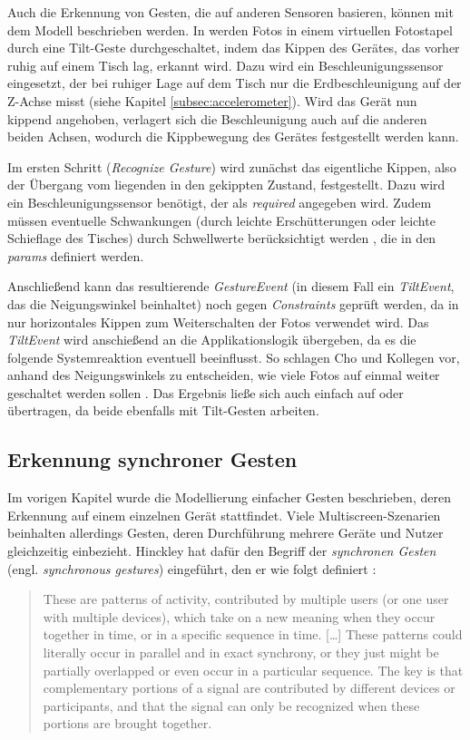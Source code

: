 Auch die Erkennung von Gesten, die auf anderen Sensoren basieren, können mit dem Modell beschrieben werden. In \citep{Lucero2011} werden Fotos in einem virtuellen Fotostapel durch eine Tilt-Geste durchgeschaltet, indem das Kippen des Gerätes, das vorher ruhig auf einem Tisch lag, erkannt wird. Dazu wird ein Beschleunigungssensor eingesetzt, der bei ruhiger Lage auf dem Tisch nur die Erdbeschleunigung auf der Z-Achse misst (siehe Kapitel \ref{subsec:accelerometer}). Wird das Gerät nun kippend angehoben, verlagert sich die Beschleunigung auch auf die anderen beiden Achsen, wodurch die Kippbewegung des Gerätes festgestellt werden kann.

Im ersten Schritt (\textit{Recognize Gesture}) wird zunächst das eigentliche Kippen, also der Übergang vom liegenden in den gekippten Zustand, festgestellt. Dazu wird ein Beschleunigungssensor benötigt, der als \textit{required} angegeben wird. Zudem müssen eventuelle Schwankungen (\zb durch leichte Erschütterungen oder leichte Schieflage des Tisches) durch Schwellwerte berücksichtigt werden \citep{Dachselt2009}, die in den \textit{params} definiert werden.

Anschließend kann das resultierende \textit{GestureEvent} (in diesem Fall ein \textit{TiltEvent}, das \zb die Neigungswinkel beinhaltet) noch gegen \textit{Constraints} geprüft werden, da in \citep{Lucero2011} \zb nur horizontales Kippen zum Weiterschalten der Fotos verwendet wird. Das \textit{TiltEvent} wird anschießend an die Applikationslogik übergeben, da es die folgende Systemreaktion eventuell beeinflusst. So schlagen Cho und Kollegen \zb vor, anhand des Neigungswinkels zu entscheiden, wie viele Fotos auf einmal weiter geschaltet werden sollen \citep{Cho2007}. Das Ergebnis ließe sich auch einfach auf \citep{Rekimoto1996} oder \citep{Dachselt2009} übertragen, da beide ebenfalls mit Tilt-Gesten arbeiten.

\subsection{Erkennung synchroner Gesten}
\label{subsec:synchronous_gesture}
Im vorigen Kapitel wurde die Modellierung einfacher Gesten beschrieben, deren Erkennung auf einem einzelnen Gerät stattfindet. Viele Multiscreen-Szenarien beinhalten allerdings Gesten, deren Durchführung mehrere Geräte und Nutzer gleichzeitig einbezieht. Hinckley hat dafür den Begriff der \textit{synchronen Gesten} (engl. \textit{synchronous gestures}) eingeführt, den er wie folgt definiert \citep{Hinckley2003}:
\begin{quote}
These are patterns of activity, contributed by multiple users (or one
user with multiple devices), which take on a new meaning when they occur together in time, or in a specific sequence in time. [\dots\unkern] These patterns could literally occur in parallel and in exact synchrony, or they just might be partially overlapped or even occur in a particular sequence. The key is that complementary portions of a signal are contributed by different devices or participants, and that the signal can only be rec\-og\-nized when these portions are brought together.
\end{quote}

